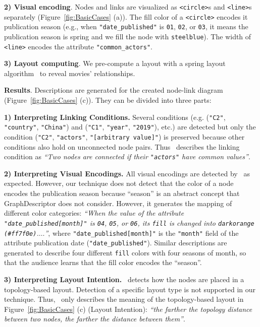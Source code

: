 \noindent \textbf{2) Visual encoding}. 
Nodes and links are visualized as \texttt{<circle>}s and \texttt{<line>}s separately (Figure~\ref{fig:BasicCases} (a)).
The fill color of a \texttt{<circle>} encodes it publication season (e.g., when \texttt{"date\_published"} is \texttt{01}, \texttt{02}, or \texttt{03}, it means the publication season is spring and we fill the node with \texttt{steelblue}).
The width of \texttt{<line>} encodes the attribute \texttt{"common\_actors"}.

\noindent \textbf{3) Layout computing}. 
We pre-compute a layout with a spring layout algorithm~\cite{DBLP:journals/spe/FruchtermanR91} to reveal movies' relationships.

\textbf{Results}.
Descriptions are generated for the created node-link diagram (Figure~\ref{fig:BasicCases} (c)).
They can be divided into three parts:

\noindent \textbf{1) Interpreting Linking Conditions.} 
Several conditions (e.g. (\texttt{"C2"}, \texttt{"country"}, \texttt{"China"}) and (\texttt{"C1"}, \texttt{"year"}, \texttt{"2019"}), etc.) are detected but only the condition (\texttt{"C2"}, \texttt{"actors"}, \texttt{"[arbitrary value]"}) is preserved because other conditions also hold on unconnected node pairs.
Thus \ApproachName~describes the linking condition as \textit{``Two nodes are connected if their {\texttt{"actors"}} have common values''}.

\noindent \textbf{2) Interpreting Visual Encodings.} 
All visual encodings are detected by \ApproachName~as expected.
However, our technique does not detect that the color of a node encodes the publication season because ``season'' is an abstract concept that GraphDescriptor does not consider.
However, it generates the mapping of different color categories: 
\textit{``When the value of the attribute {\texttt{"date\_published[month]"}} is {\texttt{04}}, {\texttt{05}}, or {\texttt{06}}, 
its {\texttt{fill}} is changed into {\texttt{darkorange (\#ff7f0e)}}.$\ldots$''}, 
where \texttt{"date\_published[month]"} is the \texttt{"month"} field of the attribute publication date (\texttt{"date\_published"}).
Similar descriptions are generated to describe four different \texttt{fill} colors with four seasons of month, so that the audience learns that the fill color encodes the ``season''.

\noindent \textbf{3) Interpreting Layout Intention.} \ApproachName~detects how the nodes are placed in a topology-based layout. 
Detection of a specific layout type is not supported in our technique.
Thus, \ApproachName~only describes the meaning of the topology-based layout in Figure~\ref{fig:BasicCases} (c) (Layout Intention): \textit{``the farther the topology distance between two nodes, the farther the distance between them''}.

